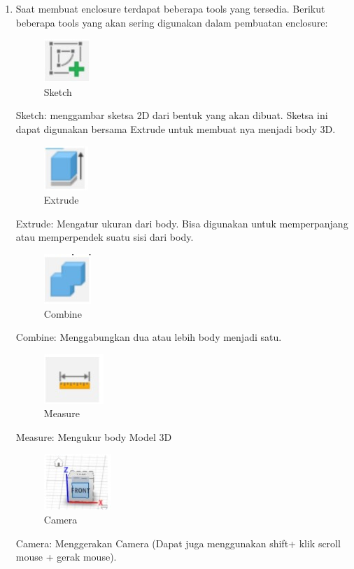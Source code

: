 \begin{enumerate}
        \item Saat membuat enclosure terdapat beberapa tools yang tersedia. Berikut beberapa tools yang
        akan sering digunakan dalam pembuatan enclosure:
            \begin{figure}[H]
                \centering
                \includegraphics[width=0.1\linewidth]{P3/img/image6.jpg}
                \caption{Sketch}
                \label{fig:Sketch}
            \end{figure}
        \begin{flushleft}
    Sketch: menggambar sketsa 2D dari bentuk yang akan dibuat. Sketsa ini dapat digunakan
    bersama Extrude untuk membuat nya menjadi body 3D.
        \begin{figure}[H]
            \centering
            \includegraphics[width=0.1\linewidth]{P3/img/image7.jpg}
            \caption{Extrude}
            \label{fig:Extrude}
        \end{figure}
    Extrude: Mengatur ukuran dari body. Bisa digunakan untuk memperpanjang atau
    memperpendek suatu sisi dari body.
        \begin{figure}[H]
            \centering
            \includegraphics[width=0.1\linewidth]{P3/img/image8.jpg}
            \caption{Combine}
            \label{fig:Combine}
        \end{figure}
    Combine: Menggabungkan dua atau lebih body menjadi satu.
        \begin{figure}[H]
            \centering
            \includegraphics[width=0.1\linewidth]{P3/img/image9.jpg}
            \caption{Measure}
            \label{fig:Measure}
        \end{figure}
    Measure: Mengukur body Model 3D
        \begin{figure}[H]
            \centering
            \includegraphics[width=0.1\linewidth]{P3/img/image10.jpg}
            \caption{Camera}
            \label{fig:Camera}
        \end{figure}
    Camera: Menggerakan Camera (Dapat juga menggunakan shift+ klik scroll mouse + gerak
    mouse).
    \end{flushleft}
\end{enumerate}

